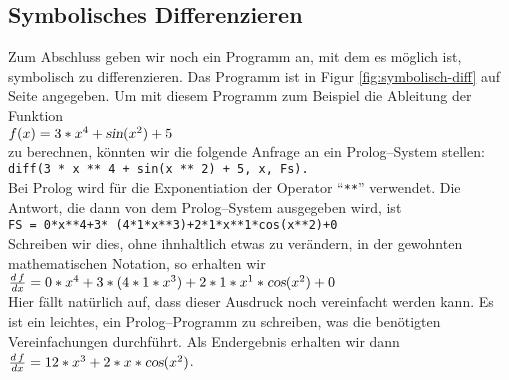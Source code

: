 \subsection{Symbolisches Differenzieren}
Zum Abschluss geben wir noch ein Programm an, mit dem es m\"{o}glich ist, symbolisch zu differenzieren.
Das Programm ist in Figur \ref{fig:symbolisch-diff} auf Seite \pageref{fig:symbolisch-diff} angegeben.
Um mit diesem Programm zum Beispiel die Ableitung der Funktion \\[0.1cm]
\hspace*{1.3cm} $f(x) = 3 * x^4 + \textsl{sin}(x^2) + 5$ \\[0.1cm]
zu berechnen, k\"{o}nnten wir die folgende Anfrage an ein Prolog--System stellen: \\[0.1cm]
\hspace*{1.3cm} \texttt{diff(3 * x ** 4 + sin(x ** 2) + 5, x, Fs). } \\[0.1cm]
Bei Prolog wird f\"{u}r die Exponentiation der Operator ``\texttt{**}'' verwendet.
Die Antwort, die dann von dem Prolog--System ausgegeben wird, ist \\[0.1cm]
\hspace*{1.3cm} \texttt{FS = 0*x**4+3* (4*1*x**3)+2*1*x**1*cos(x**2)+0} \\[0.1cm]
Schreiben wir dies, ohne ihnhaltlich etwas zu ver\"{a}ndern, in der gewohnten mathematischen Notation,
so erhalten wir \\[0.1cm]
\hspace*{1.3cm} $\frac{d\,f}{dx} = 0*x^4+3* (4*1*x^3)+2*1*x^1*\textsl{cos}(x^2)+0$ \\[0.1cm]
Hier f\"{a}llt nat\"{u}rlich auf, dass dieser Ausdruck noch vereinfacht werden kann.  Es ist ein leichtes,
ein Prolog--Programm zu schreiben, was die ben\"{o}tigten Vereinfachungen durchf\"{u}hrt.  Als Endergebnis erhalten wir dann \\[0.1cm]
\hspace*{1.3cm} \hspace*{1.3cm} $\frac{d\,f}{dx} = 12*x^3 +2*x*\textsl{cos}(x^2)$. 

